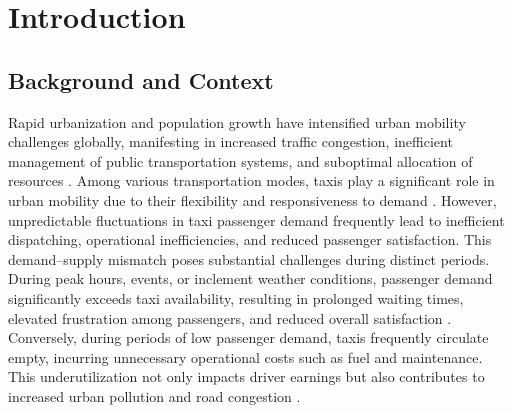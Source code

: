\documentclass{article}
\begin{document}
\begin{abstract}
Accurate taxi passenger demand prediction is essential for efficient urban transportation management. We introduce a novel framework that fuses a Multi-Scale RNN (GRU for 1–24 h, LSTM for 1–7 days, Transformer for monthly seasonality) with GraphSAGE to jointly model temporal trends and spatial dependencies in New York City taxi data. GraphSAGE employs neighbor sampling to dynamically adapt to evolving origin–destination flows while keeping computational costs low. A rolling-window incremental training strategy updates only the latest data segments, enabling real-time responsiveness without full retraining. In benchmark comparisons against CSTN and STGCN, our approach reduces MAE to 19.8 and RMSE to 31.2, while cutting overall runtime by approximately 20\%. This scalable, efficient model offers actionable demand forecasts and lays the groundwork for future extensions incorporating exogenous inputs (e.g., weather, events) and finer-grained spatial modeling at street or intersection levels.
\end{abstract}
\newpage
\tableofcontents
\newpage
\section{Introduction}

\subsection{Background and Context}
Rapid urbanization and population growth have intensified urban mobility challenges globally, manifesting in increased traffic congestion, inefficient management of public transportation systems, and suboptimal allocation of resources \cite{a2024_urban}. Among various transportation modes, taxis play a significant role in urban mobility due to their flexibility and responsiveness to demand \cite{qian_2015_spatial}. However, unpredictable fluctuations in taxi passenger demand frequently lead to inefficient dispatching, operational inefficiencies, and reduced passenger satisfaction. This demand–supply mismatch poses substantial challenges during distinct periods. During peak hours, events, or inclement weather conditions, passenger demand significantly exceeds taxi availability, resulting in prolonged waiting times, elevated frustration among passengers, and reduced overall satisfaction \cite{schaller_2005_a}. Conversely, during periods of low passenger demand, taxis frequently circulate empty, incurring unnecessary operational costs such as fuel and maintenance. This underutilization not only impacts driver earnings but also contributes to increased urban pollution and road congestion \cite{etin_2011_estimating}.
\end{document}
